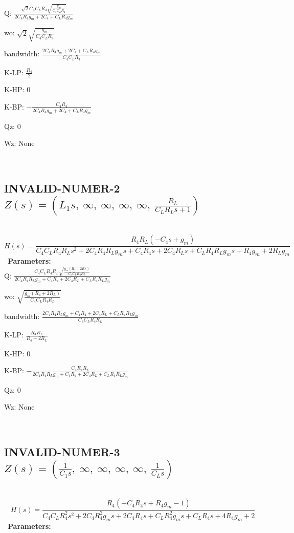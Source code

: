 \documentclass{article}
\begin{document}
Q: $\frac{\sqrt{2} C_{4} C_{L} R_{4} \sqrt{\frac{g_{m}}{C_{4} C_{L} R_{4}}}}{2 C_{4} R_{4} g_{m} + 2 C_{4} + C_{L} R_{4} g_{m}}$\ 

wo: $\sqrt{2} \sqrt{\frac{g_{m}}{C_{4} C_{L} R_{4}}}$\ 

bandwidth: $\frac{2 C_{4} R_{4} g_{m} + 2 C_{4} + C_{L} R_{4} g_{m}}{C_{4} C_{L} R_{4}}$\ 

K-LP: $\frac{R_{4}}{2}$\ 

K-HP: $0$\ 

K-BP: $- \frac{C_{4} R_{4}}{2 C_{4} R_{4} g_{m} + 2 C_{4} + C_{L} R_{4} g_{m}}$\ 

Qz: $0$\ 

Wz: $\text{None}$\ 

\ 

\subsection{INVALID-NUMER-2 $Z(s) = \left( L_{1} s, \  \infty, \  \infty, \  \infty, \  \infty, \  \frac{R_{L}}{C_{L} R_{L} s + 1}\right)$ } \ 
\textbf{\[H(s) = \frac{R_{4} R_{L} \left(- C_{4} s + g_{m}\right)}{C_{4} C_{L} R_{4} R_{L} s^{2} + 2 C_{4} R_{4} R_{L} g_{m} s + C_{4} R_{4} s + 2 C_{4} R_{L} s + C_{L} R_{4} R_{L} g_{m} s + R_{4} g_{m} + 2 R_{L} g_{m}}\] } \ 
\textbf{Parameters:}\\ 

Q: $\frac{C_{4} C_{L} R_{4} R_{L} \sqrt{\frac{g_{m} \left(R_{4} + 2 R_{L}\right)}{C_{4} C_{L} R_{4} R_{L}}}}{2 C_{4} R_{4} R_{L} g_{m} + C_{4} R_{4} + 2 C_{4} R_{L} + C_{L} R_{4} R_{L} g_{m}}$\ 

wo: $\sqrt{\frac{g_{m} \left(R_{4} + 2 R_{L}\right)}{C_{4} C_{L} R_{4} R_{L}}}$\ 

bandwidth: $\frac{2 C_{4} R_{4} R_{L} g_{m} + C_{4} R_{4} + 2 C_{4} R_{L} + C_{L} R_{4} R_{L} g_{m}}{C_{4} C_{L} R_{4} R_{L}}$\ 

K-LP: $\frac{R_{4} R_{L}}{R_{4} + 2 R_{L}}$\ 

K-HP: $0$\ 

K-BP: $- \frac{C_{4} R_{4} R_{L}}{2 C_{4} R_{4} R_{L} g_{m} + C_{4} R_{4} + 2 C_{4} R_{L} + C_{L} R_{4} R_{L} g_{m}}$\ 

Qz: $0$\ 

Wz: $\text{None}$\ 

\ 

\subsection{INVALID-NUMER-3 $Z(s) = \left( \frac{1}{C_{1} s}, \  \infty, \  \infty, \  \infty, \  \infty, \  \frac{1}{C_{L} s}\right)$ } \ 
\textbf{\[H(s) = \frac{R_{4} \left(- C_{4} R_{4} s + R_{4} g_{m} - 1\right)}{C_{4} C_{L} R_{4}^{2} s^{2} + 2 C_{4} R_{4}^{2} g_{m} s + 2 C_{4} R_{4} s + C_{L} R_{4}^{2} g_{m} s + C_{L} R_{4} s + 4 R_{4} g_{m} + 2}\] } \ 
\textbf{Parameters:}\\ 
\end{document}
